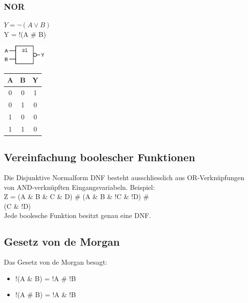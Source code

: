 \subsubsection{NOR}
\begin{center}
    \begin{minipage}{0.55\linewidth}
		$Y = \neg(A \lor B)$\\
		Y = !(A \# B)
        \begin{center}
		\includegraphics[height = 10mm]{images/nor.png}		
        \end{center}
    \end{minipage}
    \hfill
    \begin{minipage}{0.35\linewidth}
	\begin{tabular}{|c c|c|}
            \hline
            A & B & Y\\
            \hline
            0 & 0 & 1\\
            0 & 1 & 0\\
            1 & 0 & 0\\
	    1 & 1 & 0\\
            \hline
  	  \end{tabular}
    \end{minipage}
\end{center}

\subsection{Vereinfachung boolescher Funktionen}
	Die Disjunktive Normalform DNF besteht ausschliesslich aus OR-Verknüpfungen 
	von AND-verknüpften Eingangsvariabeln. Beispiel: \\
	Z = (A \& B \& C \& D) \# (A \& B \& !C \& !D) \# \\
	(C \& !D) \\
	Jede boolesche Funktion besitzt genau eine DNF.

\subsection{Gesetz von de Morgan}
Das Gesetz von de Morgan besagt:
\begin{itemize}
	\item !(A \& B) = !A \# !B
	\item !(A \# B) = !A \& !B 
\end{itemize}
